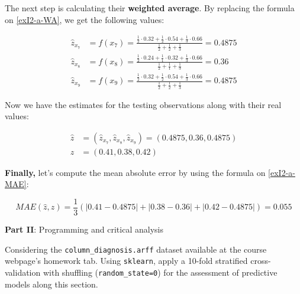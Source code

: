 \documentclass[12pt]{article}
\begin{document}
\begin{enumerate}[leftmargin=\labelsep]
\begin{enumerate}
                The next step is calculating their \textbf{weighted average}. By replacing the
                formula on \eqref{exI2-a-WA}, we get the following values:

                $$
                  \begin{aligned}
                    \hat{z}_{x_7} & = f(x_7) = \frac{\frac{1}{2} \cdot 0.32 + \frac{1}{2} \cdot 0.54 + \frac{1}{3} \cdot 0.66}{\frac{1}{2} + \frac{1}{2} + \frac{1}{3}} = 0.4875 \\
                    \hat{z}_{x_8} & = f(x_8) = \frac{\frac{1}{2} \cdot 0.24 + \frac{1}{1} \cdot 0.32 + \frac{1}{3} \cdot 0.66}{\frac{1}{2} + \frac{1}{1} + \frac{1}{3}} = 0.36   \\
                    \hat{z}_{x_9} & = f(x_9) = \frac{\frac{1}{2} \cdot 0.32 + \frac{1}{2} \cdot 0.54 + \frac{1}{3} \cdot 0.66}{\frac{1}{2} + \frac{1}{2} + \frac{1}{3}} = 0.4875
                  \end{aligned}
                $$

                Now we have the estimates for the testing observations along with their real values:

                $$
                  \begin{aligned}
                    \hat{z} & = \left(\hat{z}_{x_7}, \hat{z}_{x_8}, \hat{z}_{x_9}\right) = \left(0.4875, 0.36, 0.4875\right) \\
                    z       & = \left(0.41, 0.38, 0.42\right)
                  \end{aligned}
                $$

                \textbf{Finally,} let's compute the mean absolute error by using the formula on \eqref{exI2-a-MAE}:

                \begin{equation*}
                  MAE(\hat{z}, z) = \frac{1}{3} \left( \left|0.41 - 0.4875\right| + \left|0.38 - 0.36\right| + \left|0.42 - 0.4875\right| \right) = 0.055
                \end{equation*}

        \end{enumerate}
\end{enumerate}

\vskip 0.5cm

\begin{center}
  \large{\textbf{Part II}: Programming and critical analysis}\normalsize
\end{center}

\noindent Considering the \texttt{column\_diagnosis.arff} dataset available at the course webpage’s homework tab. Using \texttt{sklearn}, apply a 10-fold stratified
cross-validation with shuffling (\texttt{random\_state=0}) for the assessment of predictive models along this section.
\end{document}
